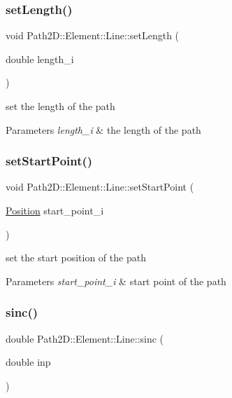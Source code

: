 \subsubsection{\texorpdfstring{set\+Length()}{setLength()}}
{\footnotesize\ttfamily void Path2\+D\+::\+Element\+::\+Line\+::set\+Length (\begin{DoxyParamCaption}\item[{double}]{length\+\_\+i }\end{DoxyParamCaption})}



set the length of the path 


\begin{DoxyParams}{Parameters}
{\em length\+\_\+i} & the length of the path \\
\hline
\end{DoxyParams}
\mbox{\label{class_path2_d_1_1_element_1_1_line_a942a5789b98659054b06c2c1a99b9c4d}} 
\subsubsection{\texorpdfstring{set\+Start\+Point()}{setStartPoint()}}
{\footnotesize\ttfamily void Path2\+D\+::\+Element\+::\+Line\+::set\+Start\+Point (\begin{DoxyParamCaption}\item[{\mbox{\hyperlink{class_path2_d_1_1_element_1_1_position}{Position}}}]{start\+\_\+point\+\_\+i }\end{DoxyParamCaption})}



set the start position of the path 


\begin{DoxyParams}{Parameters}
{\em start\+\_\+point\+\_\+i} & start point of the path \\
\hline
\end{DoxyParams}
\mbox{\label{class_path2_d_1_1_element_1_1_line_a3ab3acf1cc03a38c0f9365edcf5088ab}} 
\subsubsection{\texorpdfstring{sinc()}{sinc()}}
{\footnotesize\ttfamily double Path2\+D\+::\+Element\+::\+Line\+::sinc (\begin{DoxyParamCaption}\item[{double}]{inp }\end{DoxyParamCaption})}



